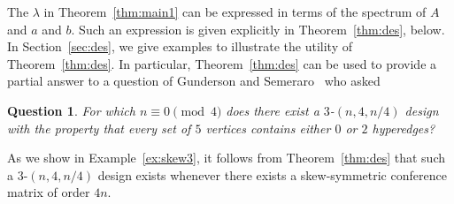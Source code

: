 \documentclass[11pt]{article}
\newtheorem{proposition}[theorem]{Proposition}
\newtheorem{question}[theorem]{Question}
\begin{document}
The $\lambda$ in Theorem~\ref{thm:main1} can be expressed in terms of the spectrum of $A$ and $a$ and $b$.
Such an expression is given explicitly in Theorem~\ref{thm:des}, below.
In Section~\ref{sec:des}, we give examples to illustrate the utility of Theorem~\ref{thm:des}.
In particular, Theorem~\ref{thm:des} can be used to provide a partial answer to a question of
Gunderson and Semeraro~\cite[Question~25]{GunSem} who asked 
\begin{question}
\label{qsn:gs}
    For which $n\equiv0\pmod{4}$ does there exist a $3$-$(n,4,n/4)$ design with the property that every set of $5$ vertices contains either $0$ or $2$ hyperedges?
\end{question}
As we show in Example~\ref{ex:skew3}, it follows from Theorem~\ref{thm:des} that such a $3$-$(n,4,n/4)$ design exists whenever there exists a skew-symmetric conference matrix of order $4n$.
\end{document}
